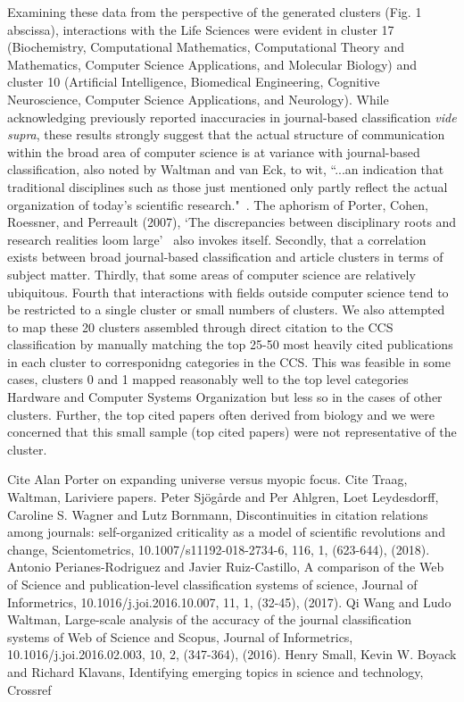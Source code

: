 Examining these data from the perspective of the generated clusters (Fig. 1 abscissa), interactions with the Life Sciences were evident in cluster 17 (Biochemistry, Computational Mathematics, Computational Theory and Mathematics, Computer Science Applications, and Molecular Biology) and cluster 10 (Artificial Intelligence, Biomedical Engineering, Cognitive Neuroscience, Computer Science Applications, and Neurology). While acknowledging previously reported inaccuracies in journal-based classification \emph{vide supra}, these results strongly suggest that the actual structure of communication within the broad area of computer science is at variance with journal-based classification, also noted by Waltman and van Eck, to wit, ``...an indication that traditional disciplines such as those just mentioned only partly reflect the actual organization of today's scientific research."~\cite{waltman_new_2012}. The aphorism of Porter, Cohen, Roessner, and Perreault (2007), `The discrepancies between disciplinary roots and research realities loom large'~\cite{porter_measuring_2007} also invokes itself. Secondly, that a correlation exists between broad journal-based classification and article clusters in terms of subject matter. Thirdly, that some areas of computer science are relatively ubiquitous. Fourth that interactions with fields outside computer science tend to be restricted to a single cluster or small numbers of clusters. We also attempted to map these 20 clusters assembled through direct citation to the CCS classification by manually matching the top 25-50 most heavily cited publications in each cluster to corresponidng categories in the CCS. This was feasible in some cases, clusters 0 and 1 mapped reasonably well to the top level categories Hardware and Computer Systems Organization but less so in the cases of other clusters. Further, the top cited papers often derived from biology and we were concerned that this small sample (top cited papers) were not representative of the cluster. 

Cite Alan Porter on expanding universe versus myopic focus. Cite Traag, Waltman, Lariviere papers. Peter Sjögårde and Per Ahlgren, Loet Leydesdorff, Caroline S. Wagner and Lutz Bornmann, Discontinuities in citation relations among journals: self-organized criticality as a model of scientific revolutions and change, Scientometrics, 10.1007/s11192-018-2734-6, 116, 1, (623-644), (2018). Antonio Perianes-Rodriguez and Javier Ruiz-Castillo, A comparison of the Web of Science and publication-level classification systems of science, Journal of Informetrics, 10.1016/j.joi.2016.10.007, 11, 1, (32-45), (2017). Qi Wang and Ludo Waltman, Large-scale analysis of the accuracy of the journal classification systems of Web of Science and Scopus, Journal of Informetrics, 10.1016/j.joi.2016.02.003, 10, 2, (347-364), (2016). Henry Small, Kevin W. Boyack and Richard Klavans, Identifying emerging topics in science and technology, 
Crossref

